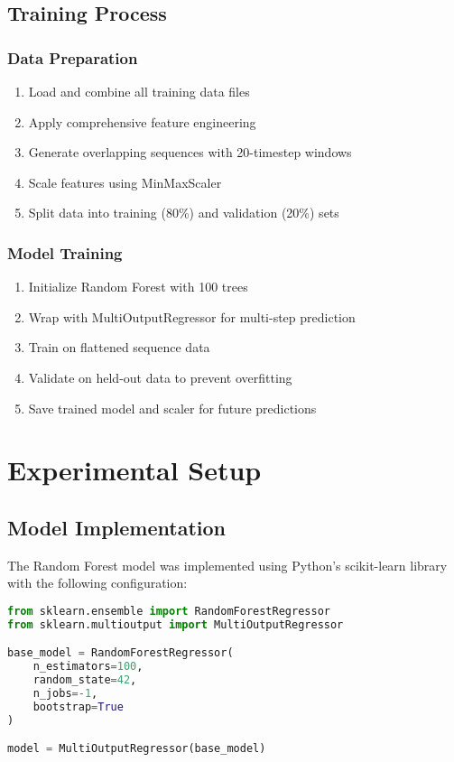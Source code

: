 \documentclass[11pt,a4paper]{article}
\begin{document}
\subsection{Training Process}

\subsubsection{Data Preparation}
\begin{enumerate}
    \item Load and combine all training data files
    \item Apply comprehensive feature engineering
    \item Generate overlapping sequences with 20-timestep windows
    \item Scale features using MinMaxScaler
    \item Split data into training (80\%) and validation (20\%) sets
\end{enumerate}

\subsubsection{Model Training}
\begin{enumerate}
    \item Initialize Random Forest with 100 trees
    \item Wrap with MultiOutputRegressor for multi-step prediction
    \item Train on flattened sequence data
    \item Validate on held-out data to prevent overfitting
    \item Save trained model and scaler for future predictions
\end{enumerate}

\section{Experimental Setup}

\subsection{Model Implementation}

The Random Forest model was implemented using Python's scikit-learn library with the following configuration:

\begin{lstlisting}[language=Python, caption=Random Forest Model Configuration]
from sklearn.ensemble import RandomForestRegressor
from sklearn.multioutput import MultiOutputRegressor

base_model = RandomForestRegressor(
    n_estimators=100,
    random_state=42,
    n_jobs=-1,
    bootstrap=True
)

model = MultiOutputRegressor(base_model)
\end{lstlisting}
\end{document}
